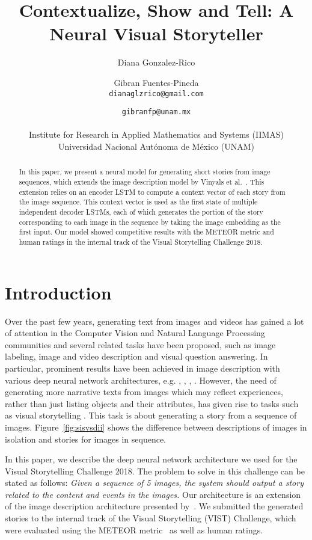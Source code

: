 \documentclass[11pt,a4paper]{article}
\title{Contextualize, Show and Tell: A Neural Visual Storyteller}
\author{Diana Gonzalez-Rico \and  Gibran Fuentes-Pineda \\
    {\tt dianaglzrico@gmail.com} \and {\tt gibranfp@unam.mx} \\\\ Institute for Research in Applied Mathematics and Systems (IIMAS)\\ Universidad Nacional Aut\'onoma de M\'exico (UNAM)}
\date{}
\begin{document}
\maketitle
\begin{abstract}
  In this paper, we present a neural model for generating short stories from image sequences, which extends the image description model by Vinyals et al.~\cite{vinyals}. 
  This extension relies on an encoder LSTM to compute a context vector of each story from the image sequence. 
  This context vector is used as the first state of multiple independent decoder LSTMs, each of which generates the portion of the story corresponding to each image in the sequence by taking the image embedding as the first input. 
  Our model showed competitive results with the METEOR metric and human ratings in the internal track of the Visual Storytelling Challenge 2018.
\end{abstract}

\section{Introduction}
Over the past few years, generating text from images and videos has gained a lot of attention in the Computer Vision and Natural Language Processing communities and several related tasks have been proposed, such as image labeling, image and video description and visual question answering. 
In particular, prominent results have been achieved in image description with various deep neural network architectures, e.g. \cite{lin}, \cite{xu}, \cite{karpathy}, \cite{vinyals}. 
However, the need of generating more narrative texts from images which may reflect experiences, rather than just listing objects and their attributes, has given rise to tasks such as visual storytelling \cite{huang2016}. 
This task is about generating a story from a sequence of images.
Figure~\ref{fig:sisvsdii} shows the difference between descriptions of images in isolation and stories for images in sequence.

In this paper, we describe the deep neural network architecture we used for the Visual Storytelling Challenge 2018. 
The problem to solve in this challenge can be stated as follows: \textit{Given a sequence of 5 images, the system should output a story related to the content and events in the images.}
Our architecture is an extension of the image description architecture presented by~\cite{vinyals}. We submitted the generated stories to the internal track of the Visual Storytelling (VIST) Challenge, which were evaluated using the METEOR metric~\cite{banerjee} as well as human ratings.
\end{document}
